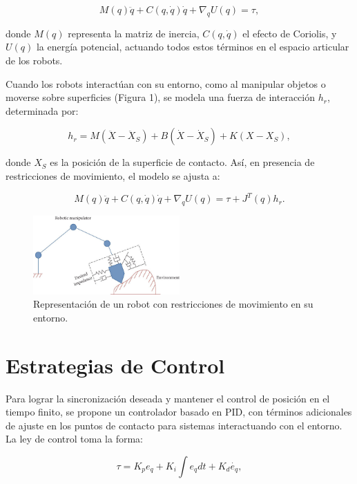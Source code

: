 \documentclass[conference]{IEEEtran}
\begin{document}
\begin{equation}
	M(q) \ddot{q} + C(q, \dot{q}) \dot{q} + \nabla_{q} U(q) = \tau,
\end{equation}

donde $M(q)$ representa la matriz de inercia, $C(q, \dot{q})$ el efecto de Coriolis, y $U(q)$ la energía potencial, actuando todos estos términos en el espacio articular de los robots.

Cuando los robots interactúan con su entorno, como al manipular objetos o moverse sobre superficies (Figura 1), se modela una fuerza de interacción \( h_r \), determinada por:

\begin{equation}
	h_{r} = M(\ddot{X} - \ddot{X}_{S}) + B(\dot{X} - \dot{X}_{S}) + K(X - X_{S}),
\end{equation}

donde $X_{S}$ es la posición de la superficie de contacto. Así, en presencia de restricciones de movimiento, el modelo se ajusta a:

\begin{equation}
	M(q) \ddot{q} + C(q, \dot{q}) \dot{q} + \nabla_{q} U(q) = \tau + J^{T}(q) h_{r}.
\end{equation}

\begin{figure}[h]
	\centering
	\includegraphics[width=0.5\textwidth]{robot-constrained.jpg}
	\caption{Representación de un robot con restricciones de movimiento en su entorno.}
\end{figure}

\section*{Estrategias de Control}
Para lograr la sincronización deseada y mantener el control de posición en el tiempo finito, se propone un controlador basado en PID, con términos adicionales de ajuste en los puntos de contacto para sistemas interactuando con el entorno. La ley de control toma la forma:

\begin{equation}
	\tau = K_{p} e_{q} + K_{i} \int e_{q} dt + K_{d} \dot{e_{q}},
\end{equation}
\end{document}
